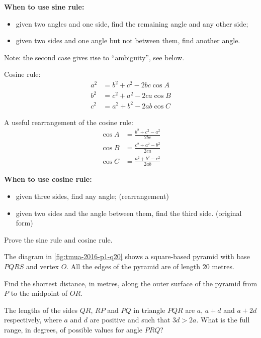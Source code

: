 \documentclass{article}
\begin{document}
\textbf{When to use sine rule:}
\begin{itemize}
    \item given two angles and one side, find the remaining angle and any other side;
    \item given two sides and one angle but not between them, find another angle.
\end{itemize}

Note: the second case gives rise to ``ambiguity'', see below.

Cosine rule:
\begin{align*}
    a^2 &= b^2 + c^2 - 2bc \cos A \\
    b^2 &= c^2 + a^2 - 2ca \cos B \\
    c^2 &= a^2 + b^2 - 2ab \cos C
\end{align*}

A useful rearrangement of the cosine rule:
\begin{align*}
    \cos A &= \frac{b^2 + c^2 - a^2}{2bc} \\
    \cos B &= \frac{c^2 + a^2 - b^2}{2ca} \\
    \cos C &= \frac{a^2 + b^2 - c^2}{2ab}
\end{align*}

\textbf{When to use cosine rule:}
\begin{itemize}
    \item given three sides, find any angle; (rearrangement)
    \item given two sides and the angle between them, find the third side. (original form)
\end{itemize}

\begin{problem}
    Prove the sine rule and cosine rule.
\end{problem}

\begin{example}[TMUA 2016 P1 Q20]
    The diagram in \autoref{fig:tmua-2016-p1-q20} shows a square-based pyramid with base \(PQRS\) and vertex \(O\). All the edges of the pyramid are of length \(20\) metres.

    Find the shortest distance, in metres, along the outer surface of the pyramid from \(P\) to the midpoint of \(OR\).
\end{example}

\begin{example}[TMUA 2017 P1 Q20]
    The lengths of the sides \(QR\), \(RP\) and \(PQ\) in triangle \(PQR\) are \(a\), \(a + d\) and \(a + 2d\) respectively, where \(a\) and \(d\) are positive and such that \(3d > 2a\). What is the full range, in degrees, of possible values for angle \(PRQ\)?    
\end{example}
\end{document}
